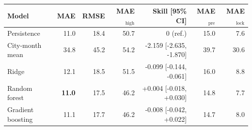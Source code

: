 \begin{tabular}{lrrrrrr}
\toprule
Model & MAE & RMSE & MAE$_{\mathrm{high}}$ & Skill [95\% CI] & MAE$_{\mathrm{pre}}$ & MAE$_{\mathrm{lock}}$ \\
\midrule
Persistence & 11.0 & 18.4 & 50.7 & 0 (ref.) & 15.0 & 7.6 \\
City-month mean & 34.8 & 45.2 & 54.2 & -2.159 [-2.635, -1.870] & 39.7 & 30.6 \\
Ridge & 12.1 & 18.5 & 51.5 & -0.099 [-0.144, -0.061] & 16.0 & 8.8 \\
Random forest & \textbf{11.0} & 17.5 & 46.2 & +0.004 [-0.018, +0.030] & 14.8 & 7.7 \\
Gradient boosting & 11.1 & 17.7 & 46.2 & -0.008 [-0.042, +0.022] & 14.7 & 8.0 \\
\bottomrule
\end{tabular}
